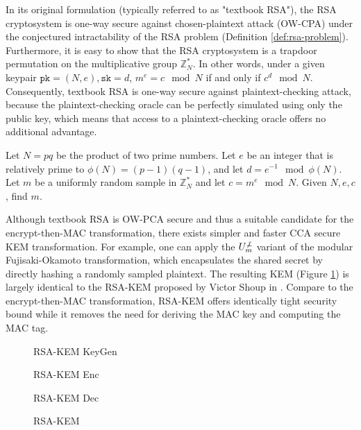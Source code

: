 \documentclass[runningheads]{llncs}
\begin{document}
In its original formulation (typically referred to as "textbook RSA"), the RSA cryptosystem is one-way secure against chosen-plaintext attack (OW-CPA) under the conjectured intractability of the RSA problem \cite{DBLP:journals/cacm/RivestSA78} (Definition \ref{def:rsa-problem}). Furthermore, it is easy to show that the RSA cryptosystem is a trapdoor permutation on the multiplicative group $\mathbb{Z}_N^\ast$. In other words, under a given keypair $\texttt{pk} = (N, e), \texttt{sk} = d$, $m^e = c \mod N$ if and only if $c^d \mod N$. Consequently, textbook RSA is one-way secure against plaintext-checking attack, because the plaintext-checking oracle can be perfectly simulated using only the public key, which means that access to a plaintext-checking oracle offers no additional advantage.

\begin{definition}\label{def:rsa-problem}
   Let $N = pq$ be the product of two prime numbers. Let $e$ be an integer that is relatively prime to $\phi(N) = (p - 1)(q - 1)$, and let $d = e^{-1} \mod \phi(N)$. Let $m$ be a uniformly random sample in $\mathbb{Z}_N^\ast$ and let $c = m^e \mod N$. Given $N, e, c$, find $m$.
\end{definition}

Although textbook RSA is OW-PCA secure and thus a suitable candidate for the encrypt-then-MAC transformation, there exists simpler and faster CCA secure KEM transformation. For example, one can apply the $U^{\not\bot}_m$ variant of the modular Fujisaki-Okamoto transformation, which encapsulates the shared secret by directly hashing a randomly sampled plaintext. The resulting KEM (Figure \ref{fig:rsa-kem}) is largely identical to the RSA-KEM proposed by Victor Shoup in \cite{DBLP:journals/iacr/Shoup01}. Compare to the encrypt-then-MAC transformation, RSA-KEM offers identically tight security bound while it removes the need for deriving the MAC key and computing the MAC tag.

\begin{figure}[h]
    \centering
    \begin{minipage}[t]{0.3\textwidth}
        \begin{algorithm}[H]
            \caption*{RSA-KEM KeyGen}
        \end{algorithm}
    \end{minipage}
    \begin{minipage}[t]{0.3\textwidth}
        \begin{algorithm}[H]
            \caption*{RSA-KEM Enc}
        \end{algorithm}
    \end{minipage}
    \begin{minipage}[t]{0.3\textwidth}
        \begin{algorithm}[H]
            \caption*{RSA-KEM Dec}
        \end{algorithm}
    \end{minipage}
    \caption{RSA-KEM}\label{fig:rsa-kem}
\end{figure}
\end{document}
